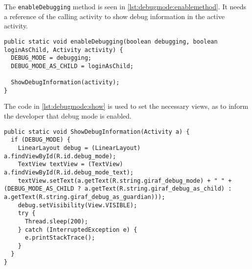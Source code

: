 The \lstinline|enableDebugging| method is seen in \cref{lst:debugmode:enablemethod}.
It needs a reference of the calling activity to show debug information in the active activity.

\begin{lstlisting}[caption={Enable debug mode by calling \lstinline|enableDebugging|.},label={lst:debugmode:enablemethod}]  
public static void enableDebugging(boolean debugging, boolean loginAsChild, Activity activity) {
  DEBUG_MODE = debugging;
  DEBUG_MODE_AS_CHILD = loginAsChild;

  ShowDebugInformation(activity);
}
\end{lstlisting}

The code in \cref{lst:debugmode:show} is used to set the necessary views, as to inform the developer that debug mode is enabled.

\begin{lstlisting}[caption={Show a debug information on activity if debug is enabled.},label={lst:debugmode:show}]  
public static void ShowDebugInformation(Activity a) {
  if (DEBUG_MODE) {
    LinearLayout debug = (LinearLayout) a.findViewById(R.id.debug_mode);
    TextView textView = (TextView) a.findViewById(R.id.debug_mode_text);
    textView.setText(a.getText(R.string.giraf_debug_mode) + " " + (DEBUG_MODE_AS_CHILD ? a.getText(R.string.giraf_debug_as_child) : a.getText(R.string.giraf_debug_as_guardian)));
    debug.setVisibility(View.VISIBLE);
    try {
      Thread.sleep(200);
    } catch (InterruptedException e) {
      e.printStackTrace();
    }
  }
}
\end{lstlisting}